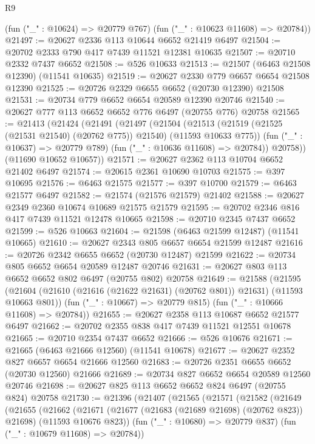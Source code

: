 \begin{lexlean}{R9}
\begin{coremodule}
{{{{{{{{{{{{{{{{{{{{{{{{{{{{{{{{{{{{{{{{{{{{{{{{{{{{{{{{{{{{{{{{{{{{{{{{{{{{{{{{{{{{      (fun ("_" : @10624) => @20779 @767)
      (fun ("_" : @10623 @11608) => @20784))
@21497 := @20627 @2336 @113 @10644 @6652 @21419 @6497
@21504 := @20702 @2333 @790 @417 @7439 @11521 @12381 @10635
@21507 := @20710 @2332 @7437 @6652
@21508 := @526 @10633
@21513 := @21507 (@6463 @21508 @12390) (@11541 @10635)
@21519 := @20627 @2330 @779 @6657 @6654 @21508 @12390
@21525 := @20726 @2329 @6655 @6652 (@20730 @12390) @21508
@21531 := @20734 @779 @6652 @6654 @20589 @12390 @20746
@21540 := @20627 @777 @113 @6652 @6652 @776 @6497 (@20755 @776) @20758
@21565 := @21413
    (@21424
      (@21491
        (@21497
          (@21504
            (@21513 (@21519 (@21525 (@21531 @21540) (@20762 @775)) @21540) (@11593 @10633 @775))
            (fun ("_" : @10637) => @20779 @789)
            (fun ("_" : @10636 @11608) => @20784))
          @20758))
      (@11690 @10652 @10657))
@21571 := @20627 @2362 @113 @10704 @6652 @21402 @6497
@21574 := @20615 @2361 @10690 @10703
@21575 := @397 @10695
@21576 := @6463 @21575
@21577 := @397 @10700
@21579 := @6463 @21577 @6497
@21582 := @21574 (@21576 @21579) @21402
@21588 := @20627 @2349 @2360 @10674 @10689 @21575 @21579
@21595 := @20702 @2346 @816 @417 @7439 @11521 @12478 @10665
@21598 := @20710 @2345 @7437 @6652
@21599 := @526 @10663
@21604 := @21598 (@6463 @21599 @12487) (@11541 @10665)
@21610 := @20627 @2343 @805 @6657 @6654 @21599 @12487
@21616 := @20726 @2342 @6655 @6652 (@20730 @12487) @21599
@21622 := @20734 @805 @6652 @6654 @20589 @12487 @20746
@21631 := @20627 @803 @113 @6652 @6652 @802 @6497 (@20755 @802) @20758
@21649 := @21588
    (@21595
      (@21604 (@21610 (@21616 (@21622 @21631) (@20762 @801)) @21631) (@11593 @10663 @801))
      (fun ("_" : @10667) => @20779 @815)
      (fun ("_" : @10666 @11608) => @20784))
@21655 := @20627 @2358 @113 @10687 @6652 @21577 @6497
@21662 := @20702 @2355 @838 @417 @7439 @11521 @12551 @10678
@21665 := @20710 @2354 @7437 @6652
@21666 := @526 @10676
@21671 := @21665 (@6463 @21666 @12560) (@11541 @10678)
@21677 := @20627 @2352 @827 @6657 @6654 @21666 @12560
@21683 := @20726 @2351 @6655 @6652 (@20730 @12560) @21666
@21689 := @20734 @827 @6652 @6654 @20589 @12560 @20746
@21698 := @20627 @825 @113 @6652 @6652 @824 @6497 (@20755 @824) @20758
@21730 := @21396
    (@21407
      (@21565
        (@21571
          (@21582
            (@21649
              (@21655
                (@21662
                  (@21671
                    (@21677 (@21683 (@21689 @21698) (@20762 @823)) @21698)
                    (@11593 @10676 @823))
                  (fun ("_" : @10680) => @20779 @837)
                  (fun ("_" : @10679 @11608) => @20784))
}}}}}}}}}}}}}}}}}}}}}}}}}}}}}}}}}}}}}}}}}}}}}}}}}}}}}}}}}}}}}}}}}}}}}}}}}}}}}}}}}}}}
\end{coremodule}
\end{lexlean}
